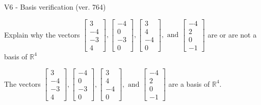 \begin{exercise}
  \begin{exerciseTitle}V6 - Basis verification (ver. 764)\end{exerciseTitle}
  \begin{exerciseStatement}
    Explain why the vectors \(\left[\begin{array}{r}
3 \\
-4 \\
-3 \\
4
\end{array}\right] , \left[\begin{array}{r}
-4 \\
0 \\
-3 \\
0
\end{array}\right] , \left[\begin{array}{r}
3 \\
4 \\
-4 \\
0
\end{array}\right] , \text{ and } \left[\begin{array}{r}
-4 \\
2 \\
0 \\
-1
\end{array}\right]\) are or are not a basis of \(\mathbb{R}^4\)	


  \end{exerciseStatement}
  \begin{exerciseAnswer}
   The vectors \(\left[\begin{array}{r}
3 \\
-4 \\
-3 \\
4
\end{array}\right] , \left[\begin{array}{r}
-4 \\
0 \\
-3 \\
0
\end{array}\right] , \left[\begin{array}{r}
3 \\
4 \\
-4 \\
0
\end{array}\right] , \text{ and } \left[\begin{array}{r}
-4 \\
2 \\
0 \\
-1
\end{array}\right]\) 
  	 are  a basis of \(\mathbb{R}^4\).
  


  \end{exerciseAnswer}
\end{exercise}
